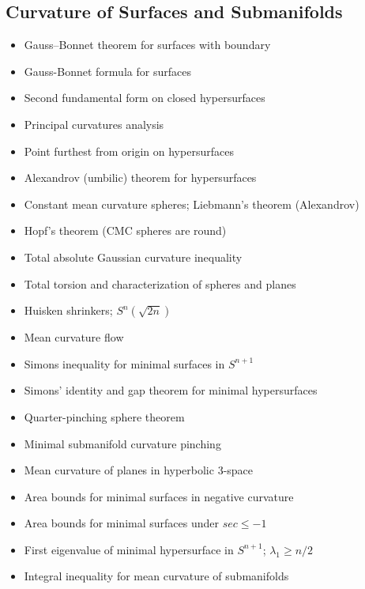 \documentclass{amsart}
\begin{document}
\subsection{Curvature of Surfaces and Submanifolds}
\begin{itemize}
    \item Gauss--Bonnet theorem for surfaces with boundary
    \item Gauss-Bonnet formula for surfaces
    \item Second fundamental form on closed hypersurfaces
    \item Principal curvatures analysis
    \item Point furthest from origin on hypersurfaces
    \item Alexandrov (umbilic) theorem for hypersurfaces
    \item Constant mean curvature spheres; Liebmann's theorem (Alexandrov)
    \item Hopf's theorem (CMC spheres are round)
    \item Total absolute Gaussian curvature inequality
    \item Total torsion and characterization of spheres and planes
    \item Huisken shrinkers; $S^n(\sqrt{2n})$
    \item Mean curvature flow
    \item Simons inequality for minimal surfaces in $S^{n+1}$
    \item Simons' identity and gap theorem for minimal hypersurfaces
    \item Quarter-pinching sphere theorem
    \item Minimal submanifold curvature pinching
    \item Mean curvature of planes in hyperbolic 3-space
    \item Area bounds for minimal surfaces in negative curvature
    \item Area bounds for minimal surfaces under $sec \leq -1$
    \item First eigenvalue of minimal hypersurface in $S^{n+1}$; $\lambda_1 \geq n/2$
    \item Integral inequality for mean curvature of submanifolds
    \end{itemize}
\end{document}
